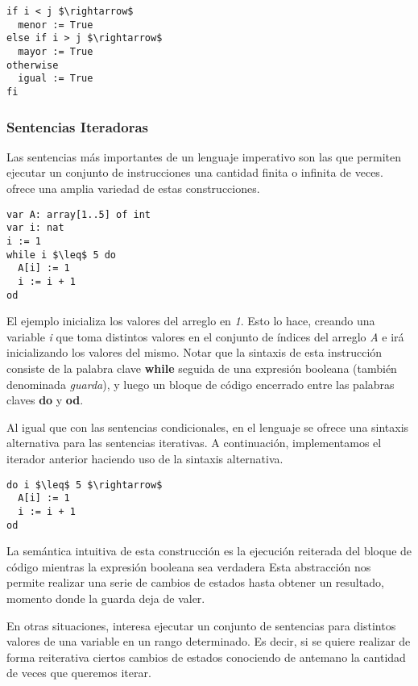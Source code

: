 \documentclass{article}
\begin{document}
\begin{lstlisting}
if i < j $\rightarrow$
  menor := True
else if i > j $\rightarrow$
  mayor := True
otherwise
  igual := True
fi
\end{lstlisting}

\subsubsection{Sentencias Iteradoras}

Las sentencias más importantes de un lenguaje imperativo son las que permiten ejecutar un conjunto de instrucciones una cantidad finita o infinita de veces.
\Lang\space ofrece una amplia variedad de estas construcciones.

\begin{lstlisting}
var A: array[1..5] of int
var i: nat
i := 1
while i $\leq$ 5 do
  A[i] := 1
  i := i + 1
od
\end{lstlisting}

El ejemplo inicializa los valores del arreglo en \textit{1}.
Esto lo hace, creando una variable \textit{i} que toma distintos valores en el conjunto de índices del arreglo \textit{A} e irá inicializando los valores del mismo.
Notar que la sintaxis de esta instrucción consiste de la palabra clave \textbf{while} seguida de una expresión booleana (también denominada \textit{guarda}), y luego un bloque de código encerrado entre las palabras claves \textbf{do} y \textbf{od}.

Al igual que con las sentencias condicionales, en el lenguaje se ofrece una sintaxis alternativa para las sentencias iterativas.
A continuación, implementamos el iterador anterior haciendo uso de la sintaxis alternativa.

\begin{lstlisting}
do i $\leq$ 5 $\rightarrow$
  A[i] := 1
  i := i + 1
od
\end{lstlisting}

La semántica intuitiva de esta construcción es la ejecución reiterada del bloque de código mientras la expresión booleana sea verdadera
Esta abstracción nos permite realizar una serie de cambios de estados hasta obtener un resultado, momento donde la guarda deja de valer.

En otras situaciones, interesa ejecutar un conjunto de sentencias para distintos valores de una variable en un rango determinado.
Es decir, si se quiere realizar de forma reiterativa ciertos cambios de estados conociendo de antemano la cantidad de veces que queremos iterar.
\end{document}
